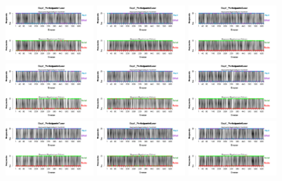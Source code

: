 \documentclass[a4paper ]{article}
\begin{document}
\begin{figure}[th]
\centering
\includegraphics[width=0.3\textwidth]{Figures/BiasResp_Exp1_P1} \includegraphics[width=0.3\textwidth]{Figures/BiasResp_Exp1_P2} \includegraphics[width=0.3\textwidth]{Figures/BiasResp_Exp1_P3}
\includegraphics[width=0.3\textwidth]{Figures/BiasResp_Exp1_P4} \includegraphics[width=0.3\textwidth]{Figures/BiasResp_Exp1_P5} \includegraphics[width=0.3\textwidth]{Figures/BiasResp_Exp1_P6}
\includegraphics[width=0.3\textwidth]{Figures/BiasResp_Exp1_P7} \includegraphics[width=0.3\textwidth]{Figures/BiasResp_Exp1_P8} \includegraphics[width=0.3\textwidth]{Figures/BiasResp_Exp1_P9}

\end{figure}
\end{document}
